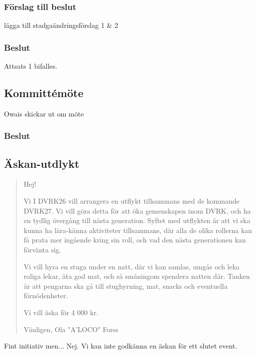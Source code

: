 \documentclass[protokoll]{dvd}
\begin{document}
\subsubsection{Förslag till beslut}
\begin{attsatser}
    \item lägga till stadgaändringsförslag 1 \& 2
\end{attsatser}
\subsubsection{Beslut}
\begin{attsatser}
    \item Attsats 1 bifalles.
\end{attsatser}

\subsection{Kommittémöte}

\begin{attsatser}
    \item Owais skickar ut om möte
\end{attsatser}
\subsubsection{Beslut}
\begin{attsatser}
    \item %
\end{attsatser}

\subsection{Äskan-utdlykt}
\begin{quote}
Hej!

Vi I DVRK26 vill arrangera en utflykt tillsammans med de kommande DVRK27. Vi vill göra detta för att öka gemenskapen inom DVRK, och ha en tydlig övergång till nästa generation. Syftet med utflykten är att vi ska kunna ha lära-känna aktiviteter tillsammans, där alla de olika rollerna kan få prata mer ingående kring sin roll, och vad den nästa generationen kan förvänta sig. 

Vi vill hyra en stuga under en natt, där vi kan samlas, umgås och leka roliga lekar, äta god mat, och så småningom spendera natten där. Tanken är att pengarna ska gå till stughyrning, mat, snacks och eventuella förnödenheter. 

Vi vill äska för 4 000 kr. 

Vänligen, 
Ola "A'LOCO" Forss
\end{quote}
\begin{attsatser}
    \item Fint initiativ men... Nej. Vi kan inte godkänna en äskan för ett slutet event. 
\end{attsatser}
\end{document}
